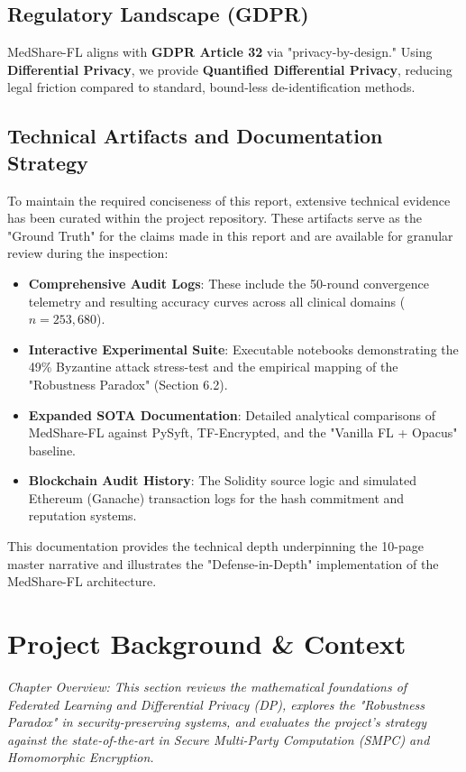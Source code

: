 \documentclass[10pt, a4paper, twocolumn]{article}
\begin{document}
\subsection{Regulatory Landscape (GDPR)}
MedShare-FL aligns with \textbf{GDPR Article 32} via "privacy-by-design." Using \textbf{Differential Privacy}, we provide \textbf{Quantified Differential Privacy}, reducing legal friction compared to standard, bound-less de-identification methods.

\subsection{Technical Artifacts and Documentation Strategy}
To maintain the required conciseness of this report, extensive technical evidence has been curated within the project repository. These artifacts serve as the "Ground Truth" for the claims made in this report and are available for granular review during the inspection:
\begin{itemize}[leftmargin=*, nosep]
    \item \textbf{Comprehensive Audit Logs}: These include the 50-round convergence telemetry and resulting accuracy curves across all clinical domains ($n=253,680$).
    \item \textbf{Interactive Experimental Suite}: Executable notebooks demonstrating the 49\% Byzantine attack stress-test and the empirical mapping of the "Robustness Paradox" (Section 6.2).
    \item \textbf{Expanded SOTA Documentation}: Detailed analytical comparisons of MedShare-FL against PySyft, TF-Encrypted, and the "Vanilla FL + Opacus" baseline.
    \item \textbf{Blockchain Audit History}: The Solidity source logic and simulated Ethereum (Ganache) transaction logs for the hash commitment and reputation systems.
\end{itemize}
This documentation provides the technical depth underpinning the 10-page master narrative and illustrates the "Defense-in-Depth" implementation of the MedShare-FL architecture.

\section{Project Background \& Context}
\label{sec:litreview}

\textit{Chapter Overview: This section reviews the mathematical foundations of Federated Learning and Differential Privacy (DP), explores the "Robustness Paradox" in security-preserving systems, and evaluates the project's strategy against the state-of-the-art in Secure Multi-Party Computation (SMPC) and Homomorphic Encryption.}
\end{document}
